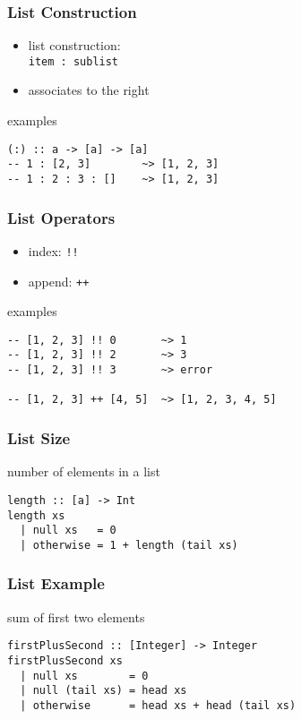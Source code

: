 \documentclass[dvipsnames]{beamer}
\theoremstyle{plain}
\begin{document}
\begin{frame}[fragile]
  \frametitle{List Construction}

  \begin{itemize}
    \item list construction:\\
      \lstinline|item : sublist|
    \item associates to the right
  \end{itemize}

  \pause
  \begin{exampleblock}{examples}
    \begin{lstlisting}
(:) :: a -> [a] -> [a]
-- 1 : [2, 3]        ~> [1, 2, 3]
-- 1 : 2 : 3 : []    ~> [1, 2, 3]
    \end{lstlisting}
  \end{exampleblock}
\end{frame}

\begin{frame}[fragile]
  \frametitle{List Operators}

  \begin{itemize}
    \item index: \lstinline|!!|
    \item append: \lstinline|++|
  \end{itemize}

  \pause
  \begin{exampleblock}{examples}
    \begin{lstlisting}
-- [1, 2, 3] !! 0       ~> 1
-- [1, 2, 3] !! 2       ~> 3
-- [1, 2, 3] !! 3       ~> error

-- [1, 2, 3] ++ [4, 5]  ~> [1, 2, 3, 4, 5]
    \end{lstlisting}
  \end{exampleblock}
\end{frame}

\begin{frame}[fragile]
  \frametitle{List Size}

  \begin{exampleblock}{number of elements in a list}
    \begin{lstlisting}[deletekeywords={length}]
length :: [a] -> Int
length xs
  | null xs   = 0
  | otherwise = 1 + length (tail xs)
    \end{lstlisting}
  \end{exampleblock}
\end{frame}

\begin{frame}[fragile]
  \frametitle{List Example}

  \begin{exampleblock}{sum of first two elements}
    \begin{lstlisting}
firstPlusSecond :: [Integer] -> Integer
firstPlusSecond xs
  | null xs        = 0
  | null (tail xs) = head xs
  | otherwise      = head xs + head (tail xs)
    \end{lstlisting}
  \end{exampleblock}
\end{frame}
\end{document}
